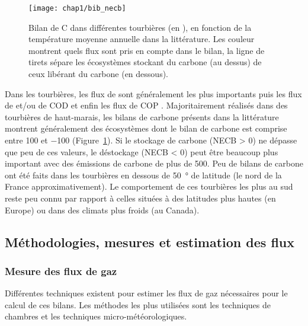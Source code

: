 \begin{figure}
\centering
\texttt{[image: chap1/bib\_necb]}
\caption{Bilan de C dans différentes tourbières (en \si{\gcma}), en fonction de la température moyenne annuelle dans la littérature. Les couleur montrent quels flux sont pris en compte dans le bilan, la ligne de tirets sépare les écosystèmes stockant du carbone (au dessus) de ceux libérant du carbone (en dessous).}
\label{fig:bib_necb}
\end{figure}


Dans les tourbières, les flux de \coo sont généralement les plus importants puis les flux de \chh et/ou de COD et enfin les flux de COP \citep{worrall2009,koehler2011}.
Majoritairement réalisés dans des tourbières de haut-marais, les bilans de carbone présents dans la littérature montrent généralement des écosystèmes dont le bilan de carbone est comprise entre 100 et \SI{-100}{\gcma} (Figure~\ref{fig:bib_necb}).
Si le stockage de carbone (NECB > 0) ne dépasse que peu de ces valeurs, le déstockage (NECB < 0) peut être beaucoup plus important avec des émissions de carbone de plus de \SI{500}{\gcma}.
Peu de bilans de carbone ont été faits dans les tourbières en dessous de \SI{50}{\degree} de latitude (le nord de la France approximativement).
Le comportement de ces tourbières les plus au sud reste peu connu par rapport à celles situées à des latitudes plus hautes (en Europe) ou dans des climats plus froids (au Canada).

\subsection{Méthodologies, mesures et estimation des flux}

\subsubsection{Mesure des flux de gaz}

Différentes techniques existent pour estimer les flux de gaz nécessaires pour le calcul de ces bilans.
Les méthodes les plus utilisées sont les techniques de chambres et les techniques micro-météorologiques.

